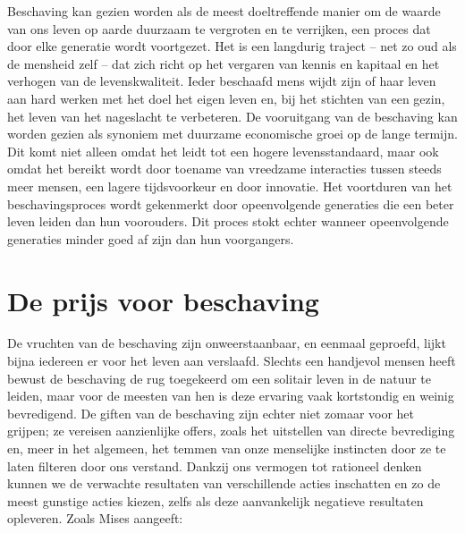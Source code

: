 Beschaving kan gezien worden als de meest doeltreffende manier om de waarde van ons leven op aarde duurzaam te vergroten en te verrijken, een proces dat door elke generatie wordt voortgezet. Het is een langdurig traject – net zo oud als de mensheid zelf – dat zich richt op het vergaren van kennis en kapitaal en het verhogen van de levenskwaliteit. Ieder beschaafd mens wijdt zijn of haar leven aan hard werken met het doel het eigen leven en, bij het stichten van een gezin, het leven van het nageslacht te verbeteren. De vooruitgang van de beschaving kan worden gezien als synoniem met duurzame economische groei op de lange termijn. Dit komt niet alleen omdat het leidt tot een hogere levensstandaard, maar ook omdat het bereikt wordt door toename van vreedzame interacties tussen steeds meer mensen, een lagere tijdsvoorkeur en door innovatie. Het voortduren van het beschavingsproces wordt gekenmerkt door opeenvolgende generaties die een beter leven leiden dan hun voorouders. Dit proces stokt echter wanneer opeenvolgende generaties minder goed af zijn dan hun voorgangers.

\hypertarget{de-prijs-voor-beschaving}{%
\section{De prijs voor beschaving}\label{de-prijs-voor-beschaving}}

De vruchten van de beschaving zijn onweerstaanbaar, en eenmaal geproefd, lijkt bijna iedereen er voor het leven aan verslaafd. Slechts een handjevol mensen heeft bewust de beschaving de rug toegekeerd om een solitair leven in de natuur te leiden, maar voor de meesten van hen is deze ervaring vaak kortstondig en weinig bevredigend. De giften van de beschaving zijn echter niet zomaar voor het grijpen; ze vereisen aanzienlijke offers, zoals het uitstellen van directe bevrediging en, meer in het algemeen, het temmen van onze menselijke instincten door ze te laten filteren door ons verstand. Dankzij ons vermogen tot rationeel denken kunnen we de verwachte resultaten van verschillende acties inschatten en zo de meest gunstige acties kiezen, zelfs als deze aanvankelijk negatieve resultaten opleveren. Zoals Mises aangeeft:


